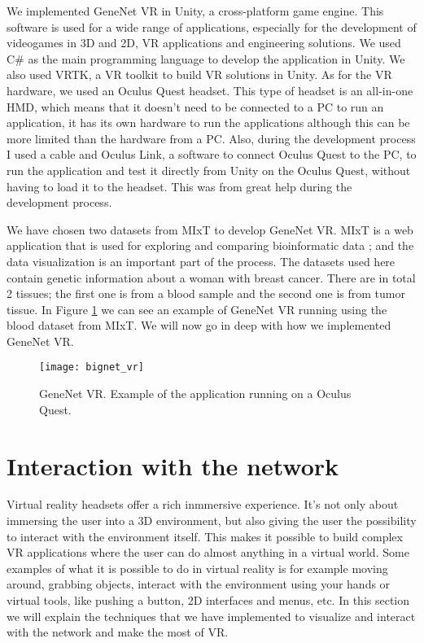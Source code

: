 We implemented GeneNet VR in Unity, a cross-platform game engine. This software is used for a wide range of applications, especially for the development of videogames in 3D and 2D, VR applications and engineering solutions. We used C\# as the main programming language to develop the application in Unity. We also used VRTK, a VR toolkit to build VR solutions in Unity. As for the VR hardware, we used an Oculus Quest headset. This type of headset is an all-in-one HMD, which means that it doesn't need to be connected to a PC to run an application, it has its own hardware to run the applications although this can be more limited than the hardware from a PC. Also, during the development process I used a cable and Oculus Link, a software to connect Oculus Quest to the PC, to run the application and test it directly from Unity on the Oculus Quest, without having to load it to the headset. This was from great help during the development process.

We have chosen two datasets from MIxT to develop GeneNet VR. MIxT is a web application that is used for exploring and comparing bioinformatic data  \cite{fjukstad_dumeaux_olsen_lund_hallett_bongo_2017}  \cite{dumeaux_fjukstad_interactions_tumor_blood}; and the data visualization is an important part of the process. The datasets used here contain genetic information about a woman with breast cancer. There are in total 2 tissues; the first one is from a blood sample and the second one is from tumor tissue. In Figure \ref{fig:bignet_vr} we can see an example of GeneNet VR running using the blood dataset from MIxT. We will now go in deep with how we implemented GeneNet VR.

\begin{figure}[h!]
    \setlength{\tempheight}{15ex}
    \centering
    \texttt{[image: bignet\_vr]}
    \caption{GeneNet VR. Example of the application running on a Oculus Quest.}
    \label{fig:bignet_vr}
\end{figure}

\section{Interaction with the network}
Virtual reality headsets offer a rich inmmersive experience. It's not only about immersing the user into a 3D environment, but also giving the user the possibility to interact with the environment itself. This makes it possible to build complex VR applications where the user can do almost anything in a virtual world. Some examples of what it is possible to do in virtual reality is for example moving around, grabbing objects, interact with the environment using your hands or virtual tools, like pushing a button, 2D interfaces and menus, etc. In this section we will explain the techniques that we have implemented to visualize and interact with the network and make the most of VR.

